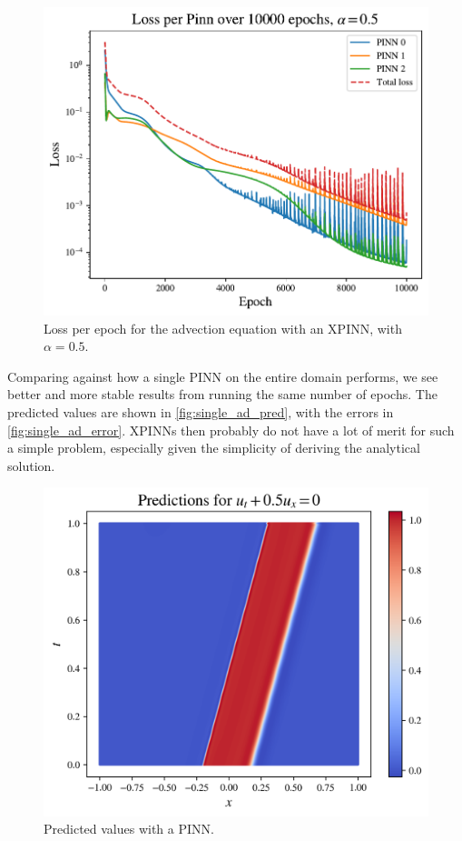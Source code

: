 \begin{figure}[h]
    \centering
    \includegraphics[width=0.8\linewidth]{Project1XPINNs/figures/advection/advection_losses.pdf}
    \caption{Loss per epoch for the advection equation with an XPINN, with $\alpha=0.5$.}
    \label{fig:loss_per_advection}
\end{figure}

Comparing against how a single PINN on the entire domain performs, we see better and more stable results from running the same number of epochs.
The predicted values are shown in \autoref{fig:single_ad_pred}, with the errors in \autoref{fig:single_ad_error}.
XPINNs then probably do not have a lot of merit for such a simple problem, especially given the simplicity of deriving the analytical solution.

\begin{figure}[h]
    \centering
    \includegraphics[width=0.8\linewidth]{Project1XPINNs/figures/advection/single_advection_predictions.png}
    \caption{Predicted values with a PINN.}
    \label{fig:single_ad_pred}
\end{figure}

